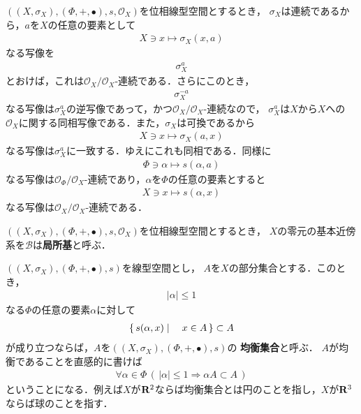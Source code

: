 	$\left(\left(X,\sigma_X\right),(\Phi,+,\bullet),s,\mathscr{O}_X\right)$を位相線型空間とするとき，
	$\sigma_X$は連続であるから，$a$を$X$の任意の要素として
	\begin{align}
		X \ni x \longmapsto \sigma_X(x,a)
		\label{partial_continuity_of_summation_of_topological_vector_spaces_1}
	\end{align}
	なる写像を
	\begin{align}
		\sigma_X^a
	\end{align}
	とおけば，これは$\mathscr{O}_X/\mathscr{O}_X$-連続である．さらにこのとき，
	\begin{align}
		\sigma_X^{-a}
	\end{align}
	なる写像は$\sigma_X^a$の逆写像であって，かつ$\mathscr{O}_X/\mathscr{O}_X$-連続なので，
	$\sigma_X^a$は$X$から$X$への$\mathscr{O}_X$に関する同相写像である．また，$\sigma_X$は可換であるから
	\begin{align}
		X \ni x \longmapsto \sigma_X(a,x)
	\end{align}
	なる写像は$\sigma_X^a$に一致する．ゆえにこれも同相である．同様に
	\begin{align}
		\Phi \ni \alpha \longmapsto s(\alpha,a)
	\end{align}
	なる写像は$\mathscr{O}_\Phi/\mathscr{O}_X$-連続であり，$\alpha$を$\Phi$の任意の要素とすると
	\begin{align}
		X \ni x \longmapsto s(\alpha,x)
	\end{align}
	なる写像は$\mathscr{O}_X/\mathscr{O}_X$-連続である．
	
	
	\begin{screen}
		\begin{dfn}[局所基]
			$\left(\left(X,\sigma_X\right),(\Phi,+,\bullet),s,\mathscr{O}_X\right)$を位相線型空間とするとき，
			$X$の零元の基本近傍系を$\mathscr{B}$は{\bf 局所基}と呼ぶ．
		\end{dfn}
	\end{screen}
	
	$\left(\left(X,\sigma_X\right),(\Phi,+,\bullet),s\right)$を線型空間とし，
	$A$を$X$の部分集合とする．このとき，
	\begin{align}
		|\alpha| \leq 1
	\end{align}
	なる$\Phi$の任意の要素$\alpha$に対して
	\begin{align}
		\left\{\, s(\alpha,x) \mid \quad x \in A\, \right\} \subset A
	\end{align}
	が成り立つならば，$A$を$\left(\left(X,\sigma_X\right),(\Phi,+,\bullet),s\right)$の
	{\bf 均衡集合}と呼ぶ．
	$A$が均衡であることを直感的に書けば
	\begin{align}
		\forall \alpha \in \Phi\,
		\left(\, |\alpha| \leq 1 \Longrightarrow \alpha A \subset A\, \right)
	\end{align}
	ということになる．例えば$X$が$\mathbf{R}^2$ならば均衡集合とは円のことを指し，$X$が$\mathbf{R}^3$ならば球のことを指す．
	
